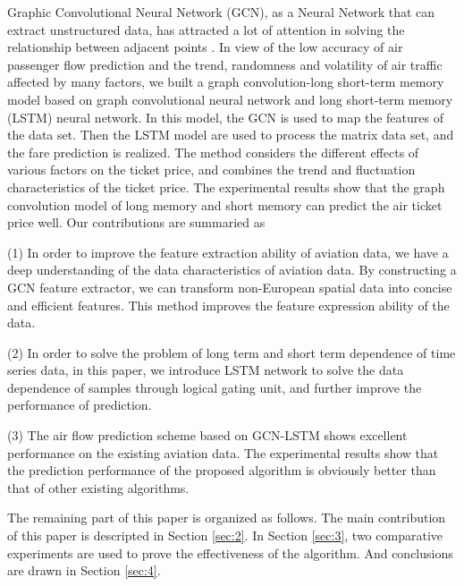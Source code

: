 \documentclass[journal,article,submit,moreauthors,pdftex]{Definitions/mdpi}
\begin{document}
\par Graphic Convolutional Neural Network (GCN), as a Neural Network that can extract unstructured data, has attracted a lot of attention in solving the relationship between adjacent points \cite{21}\cite{22}. In view of the low accuracy of air passenger flow prediction and the trend, randomness and volatility of air traffic affected by many factors, we built a graph convolution-long short-term memory model based on graph convolutional neural network and long short-term memory (LSTM) neural network. In this model, the GCN is used to map the features of the data set. Then the LSTM model are used to process the matrix data set, and the fare prediction is realized. The method considers the different effects of various factors on the ticket price, and combines the trend and fluctuation characteristics of the ticket price. The experimental results show that the graph convolution model of long memory and short memory can predict the air ticket price well. Our contributions are summaried as
\par (1) In order to improve the feature extraction ability of aviation data, we have a deep understanding of the data characteristics of aviation data. By constructing a GCN feature extractor, we can transform non-European spatial data into concise and efficient features. This method improves the feature expression ability of the data.
\par (2) In order to solve the problem of long term and short term dependence of time series data, in this paper, we introduce LSTM network to solve the data dependence of samples through logical gating unit, and further improve the performance of prediction.
\par (3)  The air flow prediction scheme based on GCN-LSTM shows excellent performance on the existing aviation data. The experimental results show that the prediction performance of the proposed algorithm is obviously better than that of other existing algorithms.



\par The remaining part of this paper is organized as follows. The main contribution of  this paper is descripted in Section \ref{sec:2}. In Section \ref{sec:3}, two comparative experiments are used to prove the effectiveness of the algorithm. And conclusions are drawn in Section \ref{sec:4}.


\end{document}

